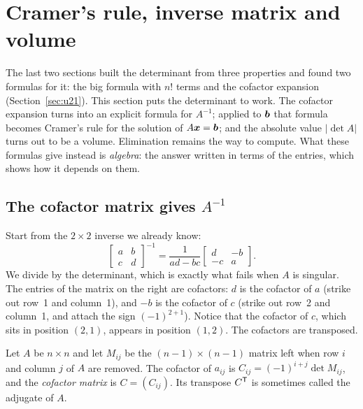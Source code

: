 \section{Cramer's rule, inverse matrix and volume}\label{sec:u22}

The last two sections built the determinant from three properties and found two formulas
for it: the big formula with $n!$ terms and the cofactor expansion
(Section~\ref{sec:u21}). This section puts the determinant to work. The cofactor expansion
turns into an explicit formula for $A^{-1}$; applied to $\boldsymbol{b}$ that formula becomes
Cramer's rule for the solution of $A\boldsymbol{x}=\boldsymbol{b}$; and the absolute value $|\det A|$ turns
out to be a volume. Elimination remains the way to compute. What these formulas give
instead is \emph{algebra}: the answer written in terms of the entries, which shows how it
depends on them.

\subsection{The cofactor matrix gives \texorpdfstring{\(A^{-1}\)}{the inverse}}

Start from the $2\times 2$ inverse we already know:
\[
  \begin{bmatrix} a & b\\ c & d\end{bmatrix}^{-1}
  =\frac{1}{ad-bc}\begin{bmatrix} d & -b\\ -c & a\end{bmatrix}.
\]
We divide by the determinant, which is exactly what fails when $A$ is singular. The entries
of the matrix on the right are cofactors: $d$ is the cofactor of $a$ (strike out row~1 and
column~1), and $-b$ is the cofactor of $c$ (strike out row~2 and column~1, and attach the
sign $(-1)^{2+1}$). Notice that the cofactor of $c$, which sits in position $(2,1)$, appears
in position $(1,2)$. The cofactors are transposed.

\begin{definition}\label{def:u22-cofactor}
Let $A$ be $n\times n$ and let $M_{ij}$ be the $(n-1)\times(n-1)$ matrix left when row $i$
and column $j$ of $A$ are removed. The cofactor of $a_{ij}$ is
$C_{ij}=(-1)^{i+j}\det M_{ij}$, and the \emph{cofactor matrix} is $C=(C_{ij})$. Its
transpose $C^{\mathsf{T}}$ is sometimes called the adjugate of $A$.
\end{definition}

